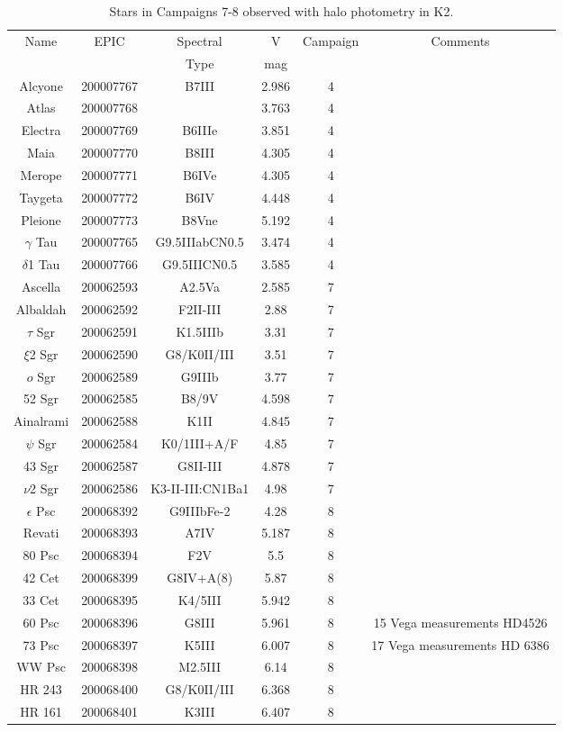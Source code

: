\begin{table*}
\caption{Stars in Campaigns 7-8 observed with halo photometry in K2.\label{table_0}}
\begin{tabular}{cccccc}
\hline \hline
Name & EPIC & Spectral & V & Campaign & Comments \\
 &  & Type & mag &  &  \\
\hline
Alcyone & 200007767 & B7III & 2.986 & 4 & \citet{White2017} \\
Atlas & 200007768 &  & 3.763 & 4 & \citet{White2017} \\
Electra & 200007769 & B6IIIe & 3.851 & 4 & \citet{White2017} \\
Maia & 200007770 & B8III & 4.305 & 4 & \citet{White2017} \\
Merope & 200007771 & B6IVe & 4.305 & 4 & \citet{White2017} \\
Taygeta & 200007772 & B6IV & 4.448 & 4 & \citet{White2017} \\
Pleione & 200007773 & B8Vne & 5.192 & 4 & \citet{White2017} \\
$\gamma$ Tau & 200007765 & G9.5IIIabCN0.5 & 3.474 & 4 &  \\
$\delta$1 Tau & 200007766 & G9.5IIICN0.5 & 3.585 & 4 &  \\
Ascella & 200062593 & A2.5Va & 2.585 & 7 &  \\
Albaldah & 200062592 & F2II-III & 2.88 & 7 &  \\
$\tau$ Sgr & 200062591 & K1.5IIIb & 3.31 & 7 &  \\
$\xi$2 Sgr & 200062590 & G8/K0II/III & 3.51 & 7 &  \\
$o$ Sgr & 200062589 & G9IIIb & 3.77 & 7 &  \\
52 Sgr & 200062585 & B8/9V & 4.598 & 7 &  \\
Ainalrami & 200062588 & K1II & 4.845 & 7 &  \\
$\psi$ Sgr & 200062584 & K0/1III+A/F & 4.85 & 7 &  \\
43 Sgr & 200062587 & G8II-III & 4.878 & 7 &  \\
$\nu$2 Sgr & 200062586 & K3-II-III:CN1Ba1 & 4.98 & 7 &  \\
$\epsilon$ Psc & 200068392 & G9IIIbFe-2 & 4.28 & 8 &  \\
Revati & 200068393 & A7IV & 5.187 & 8 &  \\
80 Psc & 200068394 & F2V & 5.5 & 8 &  \\
42 Cet & 200068399 & G8IV+A(8) & 5.87 & 8 &  \\
33 Cet & 200068395 & K4/5III & 5.942 & 8 &  \\
60 Psc & 200068396 & G8III & 5.961 & 8 & 15 Vega measurements HD4526 \\
73 Psc & 200068397 & K5III & 6.007 & 8 & 17 Vega measurements HD 6386 \\
WW Psc & 200068398 & M2.5III & 6.14 & 8 &  \\
HR 243 & 200068400 & G8/K0II/III & 6.368 & 8 &  \\
HR 161 & 200068401 & K3III & 6.407 & 8 &  \\
\hline
\end{tabular}
\end{table*}
